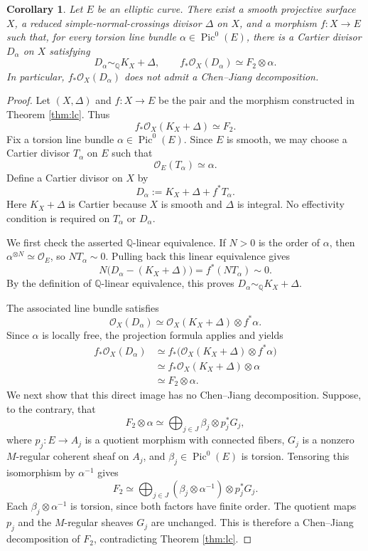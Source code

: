 \documentclass[11pt,letterpaper]{article}
\theoremstyle{paper}
\newtheorem{corollary}[theorem]{Corollary}
\newcommand{\OO}{\mathcal O}
\newcommand{\QQ}{\mathbb Q}
\newcommand{\simQ}{\sim_{\QQ}}
\DeclareMathOperator{\Pic}{Pic}
\begin{document}
\begin{corollary}\label{cor:torsion}
Let $E$ be an elliptic curve. There exist a smooth projective surface $X$, a reduced simple-normal-crossings divisor $\Delta$ on $X$, and a morphism $f:X\to E$ such that, for every torsion line bundle $\alpha\in\Pic^0(E)$, there is a Cartier divisor $D_\alpha$ on $X$ satisfying
\[
D_\alpha\simQ K_X+\Delta,\qquad f_*\OO_X(D_\alpha)\simeq F_2\otimes\alpha.
\]
In particular, $f_*\OO_X(D_\alpha)$ does not admit a Chen--Jiang decomposition.
\end{corollary}
\begin{proof}
Let $(X,\Delta)$ and $f:X\to E$ be the pair and the morphism constructed in Theorem \ref{thm:lc}. Thus
\[
f_*\OO_X(K_X+\Delta)\simeq F_2.
\]
Fix a torsion line bundle $\alpha\in\Pic^0(E)$. Since $E$ is smooth, we may choose a Cartier divisor $T_\alpha$ on $E$ such that
\[
\OO_E(T_\alpha)\simeq\alpha.
\]
Define a Cartier divisor on $X$ by
\[
D_\alpha:=K_X+\Delta+f^*T_\alpha.
\]
Here $K_X+\Delta$ is Cartier because $X$ is smooth and $\Delta$ is integral. No effectivity condition is required on $T_\alpha$ or $D_\alpha$.

We first check the asserted $\QQ$-linear equivalence. If $N>0$ is the order of $\alpha$, then $\alpha^{\otimes N}\simeq\OO_E$, so $NT_\alpha\sim0$. Pulling back this linear equivalence gives
\[
N\bigl(D_\alpha-(K_X+\Delta)\bigr)=f^*(NT_\alpha)\sim0.
\]
By the definition of $\QQ$-linear equivalence, this proves $D_\alpha\simQ K_X+\Delta$.

The associated line bundle satisfies
\[
\OO_X(D_\alpha)\simeq\OO_X(K_X+\Delta)\otimes f^*\alpha.
\]
Since $\alpha$ is locally free, the projection formula applies and yields
\begin{align*}
f_*\OO_X(D_\alpha)
&\simeq f_*\bigl(\OO_X(K_X+\Delta)\otimes f^*\alpha\bigr)\\
&\simeq f_*\OO_X(K_X+\Delta)\otimes\alpha\\
&\simeq F_2\otimes\alpha.
\end{align*}
We next show that this direct image has no Chen--Jiang decomposition. Suppose, to the contrary, that
\[
F_2\otimes\alpha\simeq\bigoplus_{j\in J}\beta_j\otimes p_j^*G_j,
\]
where $p_j:E\to A_j$ is a quotient morphism with connected fibers, $G_j$ is a nonzero $M$-regular coherent sheaf on $A_j$, and $\beta_j\in\Pic^0(E)$ is torsion. Tensoring this isomorphism by $\alpha^{-1}$ gives
\[
F_2\simeq\bigoplus_{j\in J}(\beta_j\otimes\alpha^{-1})\otimes p_j^*G_j.
\]
Each $\beta_j\otimes\alpha^{-1}$ is torsion, since both factors have finite order. The quotient maps $p_j$ and the $M$-regular sheaves $G_j$ are unchanged. This is therefore a Chen--Jiang decomposition of $F_2$, contradicting Theorem \ref{thm:lc}.
\end{proof}
\end{document}
